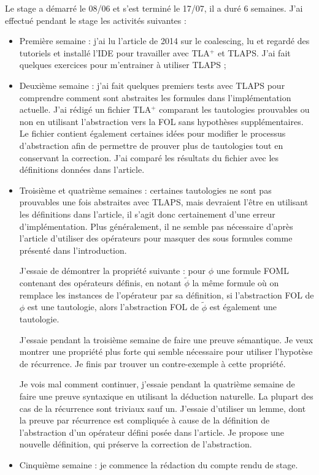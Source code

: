 \documentclass[12pt]{article}
\begin{document}
Le stage a démarré le 08/06 et s'est terminé le 17/07, il a duré 6 semaines.
J'ai effectué pendant le stage les activités suivantes :
\begin{itemize}
\item
  Première semaine :
  j'ai lu l'article de 2014 sur le coalescing, lu et regardé des tutoriels et installé l'IDE pour travailler avec TLA$^+$ et TLAPS. J'ai fait quelques exercices pour m'entrainer à utiliser TLAPS ;
\item
  Deuxième semaine :
  j'ai fait quelques premiers tests avec TLAPS pour comprendre comment sont abstraites les formules dans l'implémentation actuelle.
  J'ai rédigé un fichier TLA$^+$ comparant les tautologies prouvables ou non en utilisant l'abstraction vers la FOL sans hypothèses supplémentaires.
  Le fichier contient également certaines idées pour modifier le processus d'abstraction afin de permettre de prouver plus de tautologies tout en conservant la correction.
  J'ai comparé les résultats du fichier avec les définitions données dans l'article.
\item
  Troisième et quatrième semaines :
  certaines tautologies ne sont pas prouvables une fois abstraites avec TLAPS, mais devraient l'être en utilisant les définitions dans l'article, il s'agit donc certainement d'une erreur d'implémentation.
  Plus généralement, il ne semble pas nécessaire d'après l'article d'utiliser des opérateurs pour masquer des sous formules comme présenté dans l'introduction.
  
  J'essaie de démontrer la propriété suivante : pour $\phi$ une formule FOML contenant des opérateurs définis, en notant $\widetilde{\phi}$ la même formule où on remplace les instances de l'opérateur par sa définition, si l'abstraction FOL de $\phi$ est une tautologie, alors l'abstraction FOL de $\widetilde{\phi}$ est également une tautologie.

  J'essaie pendant la troisième semaine de faire une preuve sémantique.
  Je veux montrer une propriété plus forte qui semble nécessaire pour utiliser l'hypotèse de récurrence.
  Je finis par trouver un contre-exemple à cette propriété.

  Je vois mal comment continuer, j'essaie pendant la quatrième semaine de faire une preuve syntaxique en utilisant la déduction naturelle.
  La plupart des cas de la récurrence sont triviaux sauf un.
  J'essaie d'utiliser un lemme, dont la preuve par récurrence est compliquée à cause de la définition de l'abstraction d'un opérateur défini posée dans l'article.
  Je propose une nouvelle définition, qui préserve la correction de l'abstraction.
\item
  Cinquième semaine :
  je commence la rédaction du compte rendu de stage.
\end{itemize}
\end{document}
